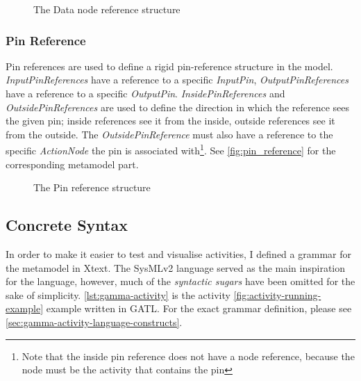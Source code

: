 \begin{figure}[!ht]
	\centering
	
	\caption{The Data node reference structure}
	\label{fig:data_source_target_reference_example}
\end{figure}

\subsubsection*{Pin Reference}\label{ssec:pin-reference}

Pin references are used to define a rigid pin-reference structure in the model. \emph{InputPinReferences} have a reference to a specific \emph{InputPin}, \emph{OutputPinReferences} have a reference to a specific \emph{OutputPin}. \emph{InsidePinReferences} and \emph{OutsidePinReferences} are used to define the direction in which the reference sees the given pin; inside references see it from the inside, outside references see it from the outside. The \emph{OutsidePinReference} must also have a reference to the specific \emph{ActionNode} the pin is associated with\footnote{Note that the inside pin reference does not have a node reference, because the node must be the activity that contains the pin}. See \autoref{fig:pin_reference} for the corresponding metamodel part.

\begin{figure}[!ht]
	\centering
	
	\caption{The Pin reference structure}
	\label{fig:pin_reference}
\end{figure}

\subsection{Concrete Syntax}

In order to make it easier to test and visualise activities, I defined a grammar for the metamodel in Xtext. The SysMLv2 language served as the main inspiration for the language, however, much of the \emph{syntactic sugars} have been omitted for the sake of simplicity. \autoref{lst:gamma-activity} is the activity \autoref{fig:activity-running-example} example written in GATL. For the exact grammar definition, please see \autoref{sec:gamma-activity-language-constructs}.

